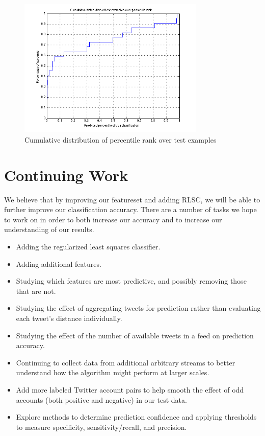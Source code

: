 \documentclass[10pt, conference, compsocconf]{IEEEtran}
\begin{document}
\begin{figure}[!t]
\centering
\includegraphics[width=3.5in]{resultcdf.png}
\caption{Cumulative distribution of percentile rank over test examples}
\label{fig_sim}
\end{figure}


\section{Continuing Work}

We believe that by improving our featureset and adding RLSC, we will
be able to further improve our classification accuracy. There are a
number of tasks we hope to work on in order to both increase our
accuracy and to increase our understanding of our results.

\begin{itemize}
\item Adding the regularized least squares classifier.
\item Adding additional features.
\item Studying which features are most predictive, and possibly
  removing those that are not.
\item Studying the effect of aggregating tweets for prediction rather
  than evaluating each tweet's distance individually.
\item Studying the effect of the number of available tweets in a feed
  on prediction accuracy.
\item Continuing to collect data from additional arbitrary streams to
  better understand how the algorithm might perform at larger scales.
\item Add more labeled Twitter account pairs to help smooth the effect
  of odd accounts (both positive and negative) in our test data.
\item Explore methods to determine prediction confidence and applying
thresholds to measure specificity, sensitivity/recall, and precision.
\end{itemize}
\end{document}
